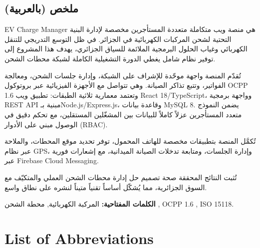 \documentclass[12pt,a4paper]{report}
\newcommand{\lr}[1]{\textenglish{#1}}
\begin{document}
\clearpage
\begin{Arabic}
\section*{ملخص (بالعربية)}

\lr{EV Charge Manager} هي منصة ويب متكاملة متعددة المستأجرين مخصصة لإدارة البنية التحتية
لشحن المركبات الكهربائية في الجزائر. في ظل التوسع التدريجي للتنقل الكهربائي وغياب الحلول
البرمجية الملائمة للسياق الجزائري، يهدف هذا المشروع إلى توفير نظام شامل يغطي الدورة
التشغيلية الكاملة لشبكة محطات الشحن.

تُقدّم المنصة واجهة موحّدة للإشراف على الشبكة، وإدارة جلسات الشحن، ومعالجة الفواتير،
وتتبع تذاكر الصيانة. وهي تتواصل مع الأجهزة الفيزيائية عبر بروتوكول \lr{OCPP 1.6} وتعتمد
معمارية ثلاثية الطبقات: تطبيق ويب \lr{React 18/TypeScript}، وواجهة برمجية
\lr{REST API} مبنية بـ\lr{Node.js/Express.js}، وقاعدة بيانات \lr{MySQL 8}. يضمن النموذج
متعدد المستأجرين عزلاً كاملاً للبيانات بين المشغّلين المستقلين، مع تحكم دقيق في الوصول
مبني على الأدوار (\lr{RBAC}).

تُكمَّل المنصة بتطبيقات مخصصة للهاتف المحمول، توفر تحديد موقع المحطات، والملاحة عبر نظام
\lr{GPS}، وإدارة الجلسات، ومتابعة تدخلات الصيانة الميدانية، مع إشعارات فورية عبر
\lr{Firebase Cloud Messaging}.

تُثبت النتائج المحققة صحة تصميم حل إدارة محطات الشحن العملي والمتكيّف مع السوق الجزائرية،
مما يُشكّل أساساً تقنياً متيناً لنشره على نطاق واسع.

\medskip
\noindent\textbf{الكلمات المفتاحية:} المركبة الكهربائية, محطة الشحن , \lr{OCPP 1.6} , \lr{ISO 15118}.
\end{Arabic}

\tableofcontents
\listoffigures
\listoftables

\chapter*{List of Abbreviations}
\end{document}
